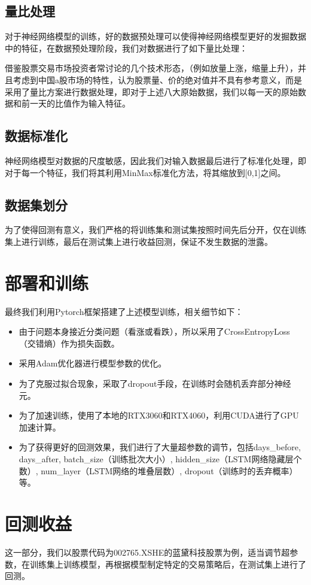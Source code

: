 \documentclass[UTF8]{ctexart}
\begin{document}
\subsection{量比处理}
对于神经网络模型的训练，好的数据预处理可以使得神经网络模型更好的发掘数据中的特征，在数据预处理阶段，我们对数据进行了如下量比处理：

借鉴股票交易市场投资者常讨论的几个技术形态，（例如放量上涨，缩量上升），并且考虑到中国a股市场的特性，认为股票量、价的绝对值并不具有参考意义，而是采用了量比方案进行数据处理，即对于上述八大原始数据，我们以每一天的原始数据和前一天的比值作为输入特征。
\subsection{数据标准化}
神经网络模型对数据的尺度敏感，因此我们对输入数据最后进行了标准化处理，即对于每一个特征，我们将其利用MinMax标准化方法，将其缩放到[0,1]之间。
\subsection{数据集划分}
为了使得回测有意义，我们严格的将训练集和测试集按照时间先后分开，仅在训练集上进行训练，最后在测试集上进行收益回测，保证不发生数据的泄露。

\section{部署和训练}
最终我们利用Pytorch框架搭建了上述模型训练，相关细节如下：
\begin{itemize}
    \item 由于问题本身接近分类问题（看涨或看跌），所以采用了CrossEntropyLoss（交错熵）作为损失函数。
    \item 采用Adam优化器进行模型参数的优化。
    \item 为了克服过拟合现象，采取了dropout手段，在训练时会随机丢弃部分神经元。
    \item 为了加速训练，使用了本地的RTX3060和RTX4060，利用CUDA进行了GPU加速计算。
    \item 为了获得更好的回测效果，我们进行了大量超参数的调节，包括days\_before, days\_after, batch\_size（训练批次大小）, hidden\_size（LSTM网络隐藏层个数）, num\_layer（LSTM网络的堆叠层数）, dropout（训练时的丢弃概率）等。
\end{itemize}

\section{回测收益}
这一部分，我们以股票代码为002765.XSHE的蓝黛科技股票为例，适当调节超参数，在训练集上训练模型，再根据模型制定特定的交易策略后，在测试集上进行了回测。
\end{document}
